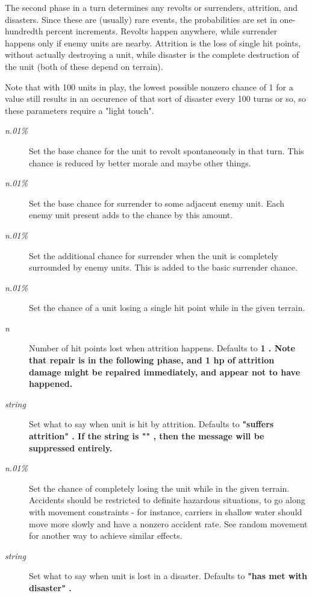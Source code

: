 The second phase in a turn determines any revolts or surrenders, attrition,
and disasters.  Since these are (usually) rare events, the probabilities
are set in one-hundredth percent increments.  Revolts happen anywhere, while
surrender happens only if enemy units are nearby.  Attrition is the loss
of single hit points, without actually destroying a unit, while disaster
is the complete destruction of the unit (both of these depend on terrain).
\par\noindent
Note that
with 100 units in play, the lowest possible nonzero chance of 1 for a value
still results in an occurence of that sort of
disaster every 100 turns or so, so these parameters require a "light touch".
\begin{description}
\item[{%
\it n.01\%}]
Set the base chance for the unit to revolt spontaneously in that turn.
This chance is reduced by better morale and maybe other things.
\item[{%
\it n.01\%}]
Set the base chance for surrender to some adjacent enemy unit.
Each enemy unit present adds to the chance by this amount.
\item[{%
\it n.01\%}]
Set the additional chance for surrender when the unit is completely
surrounded by enemy units.  This is added to the basic surrender chance.
\item[{%
\it n.01\%}]
Set the chance of a unit losing a single hit point while in the given
terrain.
\item[{%
\it n}]
Number of hit points lost when attrition happens.  Defaults to %
\bf 1\rm%
.
Note that repair is in the following phase, and 1 hp of attrition damage
might be repaired immediately, and appear not to have happened.
\item[{%
\it string}]
Set what to say when unit is hit by attrition.
Defaults to %
\bf "suffers attrition"\rm%
.
If the string is %
\bf ""\rm%
, then the message will be suppressed entirely.
\item[{%
\it n.01\%}]
Set the chance of completely losing the unit while in the given terrain.
Accidents should be restricted to definite hazardous situations, to go along
with movement constraints - for instance, carriers in shallow water should
move more slowly and have a nonzero accident rate.
See random movement for another way to achieve similar effects.
\item[{%
\it string}]
Set what to say when unit is lost in a disaster.
Defaults to %
\bf "has met with disaster"\rm%
.
\end{description}\par\noindent
